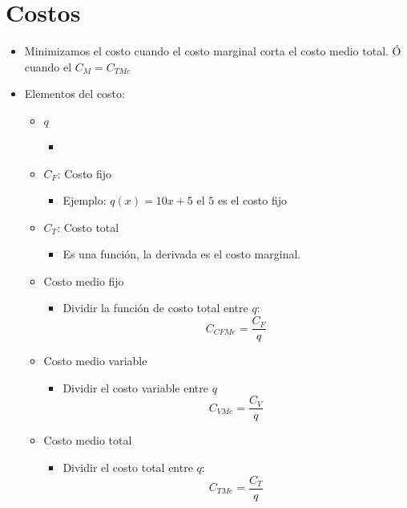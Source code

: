 \section{Costos}
\begin{itemize}
    \item Minimizamos el costo cuando el costo marginal corta el costo medio total. Ó cuando el $C_M = C_{TMe}$ 
    \item Elementos del costo:
        \begin{itemize}
            \item $q$ 
                \begin{itemize}
                    \item 
                \end{itemize}
            
            \item $C_F$: Costo fijo 
                \begin{itemize}
                    \item Ejemplo: $q(x) = 10x + 5$ el $5$ es el costo fijo
                \end{itemize}
            
            \item $C_T$: Costo total
                \begin{itemize}
                    \item Es una función, la derivada es el costo marginal. 
                \end{itemize}
            
            \item Costo medio fijo 
                \begin{itemize}
                    \item Dividir la función de costo total entre $q$:
                        \[
                          C_{CFMe} = \frac{C_F}{q} 
                        \]
                \end{itemize}
            
            \item Costo medio variable 
                \begin{itemize}
                    \item Dividir el costo variable entre $q$
                        \[
                          C_{VMe} = \frac{C_V }{q} 
                        \]
                \end{itemize}
            
            \item Costo medio total 
                \begin{itemize}
                    \item Dividir el costo total entre $q$:
                        \[
                            C_{TMe} = \frac{C_T}{q} 
                        \]
                \end{itemize}
            

\end{itemize}
\end{itemize}
